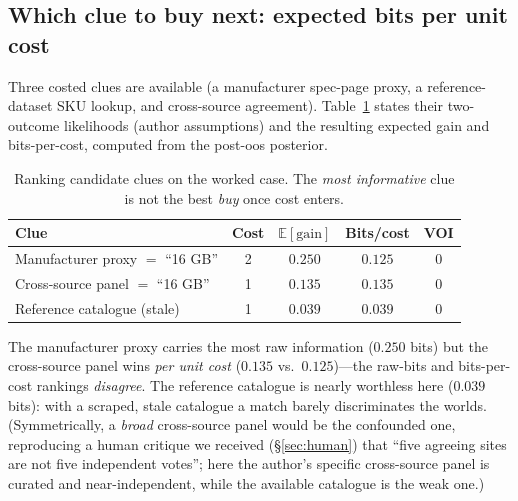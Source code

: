 \documentclass[11pt]{article}
\begin{document}
\subsection{Which clue to buy next: expected bits per unit cost}
Three costed clues are available (a manufacturer spec-page proxy, a reference-dataset
SKU lookup, and cross-source agreement). Table~\ref{tab:clues} states their
two-outcome likelihoods (author assumptions) and the resulting expected gain and
bits-per-cost, computed from the post-oos posterior.

\begin{table}[h]\centering\small
\caption{Ranking candidate clues on the worked case. The \emph{most informative} clue
is not the best \emph{buy} once cost enters.}
\label{tab:clues}
\begin{tabular}{lcccc}
\toprule
Clue & Cost & $\mathbb{E}[\text{gain}]$ & Bits/cost & VOI\\
\midrule
Manufacturer proxy $=$ ``16 GB'' & 2 & $\mathbf{0.250}$ & $0.125$ & $0$\\
Cross-source panel $=$ ``16 GB'' & 1 & $0.135$ & $\mathbf{0.135}$ & $0$\\
Reference catalogue (stale) & 1 & $0.039$ & $0.039$ & $0$\\
\bottomrule
\end{tabular}
\end{table}

The manufacturer proxy carries the most raw information ($0.250$ bits) but the
cross-source panel wins \emph{per unit cost} ($0.135$ vs.\ $0.125$)---the raw-bits and
bits-per-cost rankings \emph{disagree}. The reference catalogue is nearly worthless
here ($0.039$ bits): with a scraped, stale catalogue a match barely discriminates the
worlds. (Symmetrically, a \emph{broad} cross-source panel would be the confounded one,
reproducing a human critique we received (\S\ref{sec:human}) that ``five agreeing sites
are not five independent votes''; here the author's specific cross-source panel is
curated and near-independent, while the available catalogue is the weak one.)
\end{document}
